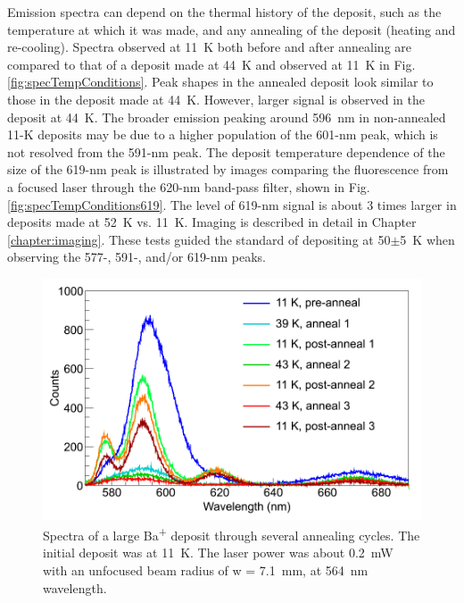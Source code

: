 Emission spectra can depend on the thermal history of the deposit, such as the temperature at which it was made, and any annealing of the deposit (heating and re-cooling).  Spectra observed at 11~K both before and after annealing are compared to that of a deposit  made at 44~K and observed at 11~K in Fig. \ref{fig:specTempConditions}.  Peak shapes in the annealed deposit look similar to those in the deposit made at 44~K.  However, larger signal is observed in the deposit at 44~K.  The broader emission peaking around 596~nm in non-annealed 11-K deposits may be due to a higher population of the 601-nm peak, which is not resolved from the 591-nm peak.  The deposit temperature dependence of the size of the 619-nm peak is illustrated by images comparing the fluorescence from a focused laser through the 620-nm band-pass filter, shown in Fig. \ref{fig:specTempConditions619}.  The level of 619-nm signal is about 3 times larger in deposits made at 52~K vs. 11~K.  Imaging is described in detail in Chapter \ref{chapter:imaging}.  These tests guided the standard of depositing at 50$\pm$5~K when observing the 577-, 591-, and/or 619-nm peaks.







\begin{figure} %
        \centering
                \includegraphics[width=.7\textwidth]{figures/spectra_annealing.png}
                \caption{Spectra of a large Ba\textsuperscript{+} deposit through several annealing cycles.  The initial deposit was at 11~K.  The laser power was about 0.2~mW with an unfocused beam radius of w = 7.1~mm, at 564~nm wavelength.  \cite{Mong2015}}
\label{fig:specAnneal}
\end{figure}

